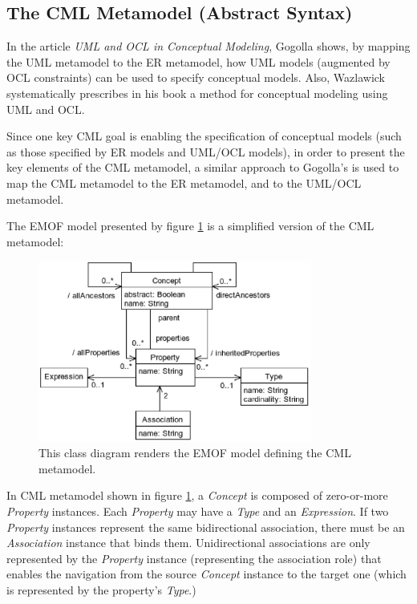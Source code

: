 \subsection{The CML Metamodel (Abstract Syntax)}\label{subsec:metamodel}

In the article \emph{UML and OCL in Conceptual Modeling}, 
Gogolla \cite{gogolla} shows, by mapping the UML \cite{uml} metamodel to the ER \cite{er} metamodel,
how UML models (augmented by OCL \cite{ocl} constraints) can be used to specify conceptual models.
Also, Wazlawick \cite{wazlawick} systematically prescribes in his book a method for conceptual modeling using UML and OCL. 

Since one key CML goal is enabling the specification of conceptual models
(such as those specified by ER models and UML/OCL models),
in order to present the key elements of the CML metamodel,
a similar approach to Gogolla's is used to map the CML metamodel to the ER metamodel,
and to the UML/OCL metamodel.

The EMOF \cite{mof} model presented by figure \ref{fig:metamodel} is a simplified version of the CML metamodel:

\begin{figure}
\centering
\includegraphics[width=0.8\textwidth]{language/diagram-metamodel}
\caption{This class diagram renders the EMOF \cite{mof} model defining the CML metamodel.}
\label{fig:metamodel}
\end{figure}

In CML metamodel shown in figure \ref{fig:metamodel},
a \emph{Concept} is composed of zero-or-more \emph{Property} instances.
Each \emph{Property} may have a \emph{Type} and an \emph{Expression}.
If two \emph{Property} instances represent the same bidirectional association,
there must be an \emph{Association} instance that binds them.
Unidirectional associations are only represented by the \emph{Property} instance (representing the association role)
that enables the navigation from the source \emph{Concept} instance to the target one (which is represented by the property's \emph{Type}.)

